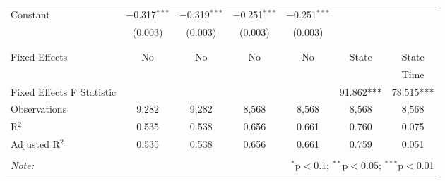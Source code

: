 \begin{table}[!htbp]
\begin{tabular}{@{\extracolsep{5pt}}lcccccc}
 Constant & $-$0.317$^{***}$ & $-$0.319$^{***}$ & $-$0.251$^{***}$ & $-$0.251$^{***}$ &  &  \\ 
  & (0.003) & (0.003) & (0.003) & (0.003) &  &  \\ 
  & & & & & & \\ 
\hline \\[-1.8ex] 
Fixed Effects & No & No & No & No & State & State \\ 
 &  &  &  &  &  & Time \\ 
Fixed Effects F Statistic &  &  &  &  & 91.862*** & 78.515*** \\ 
Observations & 9,282 & 9,282 & 8,568 & 8,568 & 8,568 & 8,568 \\ 
R$^{2}$ & 0.535 & 0.538 & 0.656 & 0.661 & 0.760 & 0.075 \\ 
Adjusted R$^{2}$ & 0.535 & 0.538 & 0.656 & 0.661 & 0.759 & 0.051 \\ 
\hline 
\hline \\[-1.8ex] 
\textit{Note:}  & \multicolumn{6}{r}{$^{*}$p$<$0.1; $^{**}$p$<$0.05; $^{***}$p$<$0.01} \\ 
\end{tabular} 
\end{table} 
